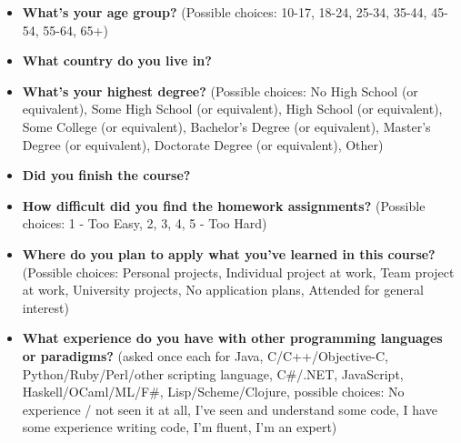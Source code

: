 \documentclass{sig-alternate}
\begin{document}
\begin{itemize}

\item {\bf What's your age group?} (Possible choices: 10-17, 18-24, 25-34, 35-44,
  45-54, 55-64, 65+)

\item {\bf What country do you live in?}

\item {\bf What's your highest degree?} (Possible choices: No High School (or equivalent), Some High
  School (or equivalent), High School (or equivalent), Some College (or equivalent), Bachelor's
  Degree (or equivalent), Master's Degree (or equivalent), Doctorate Degree (or equivalent),
  Other)

\item {\bf Did you finish the course?}

\item {\bf How difficult did you find the homework assignments?} (Possible choices: 1 - Too Easy, 2,
  3, 4, 5 - Too Hard)

\item {\bf Where do you plan to apply what you've learned in this course?} (Possible choices:
  Personal projects, Individual project at work, Team project at work, University projects, No
  application plans, Attended for general interest)

\item {\bf What experience do you have with other programming languages or paradigms?} (asked once
  each for Java, C/C++/Objective-C, Python/Ruby/Perl/other scripting language, C\#/.NET,
  JavaScript, \\Haskell/OCaml/ML/F\#, Lisp/Scheme/Clojure, possible choices: No experience /
  not seen it at all, I've seen and understand some code, I have some experience writing code,
  I'm fluent, I'm an expert)

\end{itemize}

\end{document}

